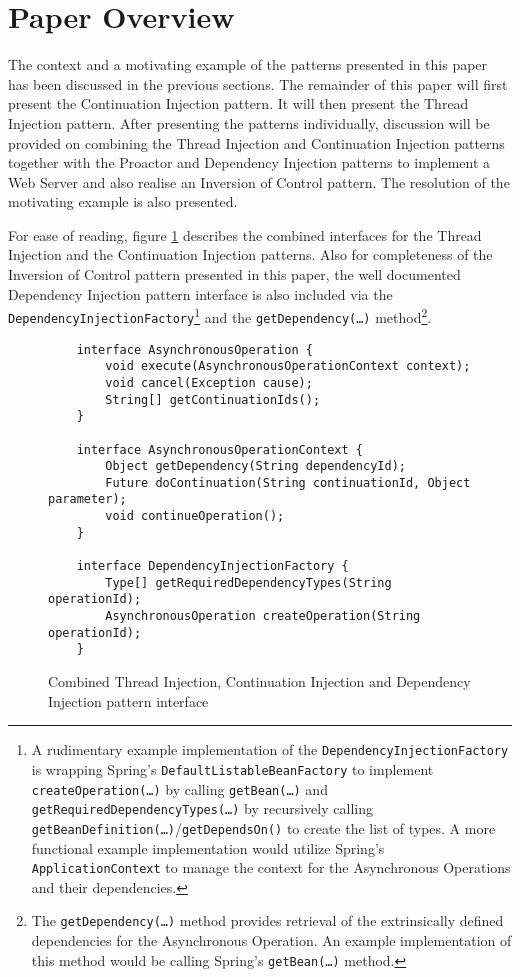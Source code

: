 \documentclass[prodmode]{style/acmlarge}
\begin{document}
\section{Paper Overview}

The context and a motivating example of the patterns presented in this paper has
been discussed in the previous sections.  The remainder of this paper will first
present the Continuation Injection pattern.  It will then present the Thread
Injection pattern.  After presenting the patterns individually, discussion will
be provided on combining the Thread Injection and Continuation Injection
patterns together with the Proactor and Dependency Injection patterns to
implement a Web Server and also realise an Inversion of Control pattern.  The
resolution of the motivating example is also presented.

For ease of reading, figure \ref{fig:InjectionInterfaces} describes the combined
interfaces for the Thread Injection and the Continuation Injection patterns. 
Also for completeness of the Inversion of Control pattern presented in this
paper, the well documented Dependency Injection pattern \cite{ioc} interface is
also included via the \texttt{DependencyInjectionFactory}\footnote{A rudimentary
example implementation of the \texttt{DependencyInjectionFactory} is wrapping
Spring's \cite{spring} \texttt{DefaultListableBeanFactory} to implement
\texttt{createOperation(\ldots)} by calling \texttt{getBean(\ldots)} and
\texttt{getRequiredDependencyTypes(\ldots)} by recursively calling
\texttt{getBeanDefinition(\ldots)}/\texttt{getDependsOn()} to create the list of
types.  A more functional example implementation would utilize Spring's
\texttt{ApplicationContext} to manage the context for the Asynchronous
Operations and their dependencies.} and the \texttt{getDependency(\ldots)}
method\footnote{The \texttt{getDependency(\ldots)} method provides retrieval of
the extrinsically defined dependencies for the Asynchronous Operation.  An
example implementation of this method would be calling Spring's \cite{spring}
\texttt{getBean(\ldots)} method.}.

\begin{figure}[tp]
\centering
\begin{verbatim}
    interface AsynchronousOperation {
        void execute(AsynchronousOperationContext context);
        void cancel(Exception cause);
        String[] getContinuationIds();
    }

    interface AsynchronousOperationContext {
        Object getDependency(String dependencyId);
        Future doContinuation(String continuationId, Object parameter);
        void continueOperation();
    }
    
    interface DependencyInjectionFactory {
        Type[] getRequiredDependencyTypes(String operationId);
        AsynchronousOperation createOperation(String operationId);
    }
\end{verbatim}
\caption{Combined Thread Injection, Continuation Injection and Dependency Injection pattern interface\footnotemark}
\label{fig:InjectionInterfaces}
\end{figure}
\end{document}
